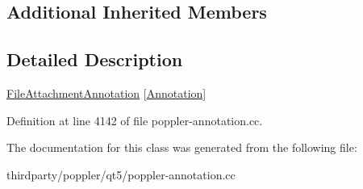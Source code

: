 \subsection*{Additional Inherited Members}


\subsection{Detailed Description}
\hyperlink{class_poppler_1_1_file_attachment_annotation}{File\+Attachment\+Annotation} \mbox{[}\hyperlink{class_poppler_1_1_annotation}{Annotation}\mbox{]} 

Definition at line 4142 of file poppler-\/annotation.\+cc.



The documentation for this class was generated from the following file\+:\begin{DoxyCompactItemize}
\item 
thirdparty/poppler/qt5/poppler-\/annotation.\+cc\end{DoxyCompactItemize}
